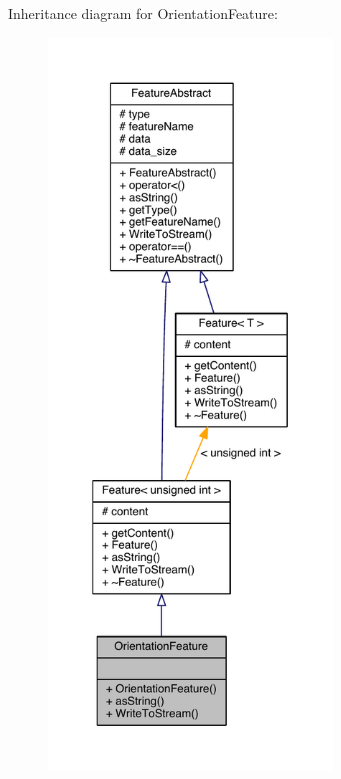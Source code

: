 Inheritance diagram for Orientation\+Feature\+:
\nopagebreak
\begin{figure}[H]
\begin{center}
\leavevmode
\includegraphics[height=550pt]{class_orientation_feature__inherit__graph}
\end{center}
\end{figure}


